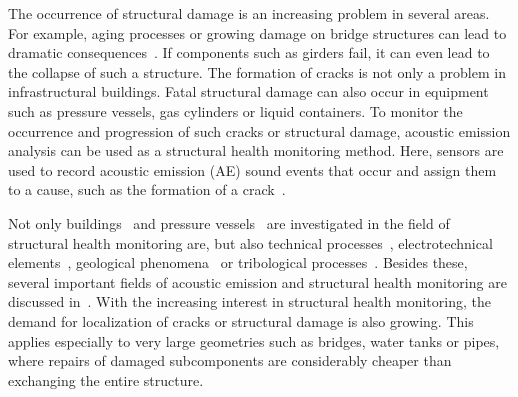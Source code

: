 \documentclass{ieeeaccess}
\begin{document}
The occurrence of structural damage is an increasing problem in several areas. For example, aging processes or growing damage on bridge structures can lead to dramatic consequences~\cite{ImamB2010Arom}. If components such as girders fail, it can even lead to the collapse of such a structure. The formation of cracks is not only a problem in  infrastructural buildings. Fatal structural damage can also occur in equipment such as pressure vessels, gas cylinders or liquid containers. To monitor the occurrence and progression of such cracks or structural damage, acoustic emission analysis can be used as a structural health monitoring method. Here, sensors are used to record acoustic emission (AE) sound events that occur and assign them to a cause, such as the formation of a crack~\cite{grosse2008acoustic}.

Not only buildings~\cite{BEHNIA2014282} and pressure vessels~\cite{CHOU2015111} are investigated in the field of structural health monitoring are, but also technical processes~\cite{LI2002157}, electrotechnical elements~\cite{AoA1714}, geological phenomena~\cite{smith2017photographic} or tribological processes~\cite{tian2015correlation}. Besides these, several important fields of acoustic emission and structural health monitoring are discussed in~\cite{app8060958}.
With the increasing interest in structural health monitoring, the demand for localization of cracks or structural damage is also growing. This applies especially to very large geometries such as bridges, water tanks or pipes, where repairs of damaged subcomponents are considerably cheaper than exchanging the entire structure. 
\end{document}
